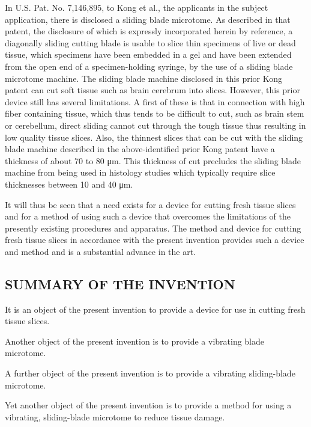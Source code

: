 \documentclass{article}
\begin{document}
In U.S. Pat. No. 7,146,895, to Kong et al., the applicants in the subject application, there is disclosed a sliding blade microtome. As described in that patent, the disclosure of which is expressly incorporated herein by reference, a diagonally sliding cutting blade is usable to slice thin specimens of live or dead tissue, which specimens have been embedded in a gel and have been extended from the open end of a specimen-holding syringe, by the use of a sliding blade microtome machine. The sliding blade machine disclosed in this prior Kong patent can cut soft tissue such as brain cerebrum into slices. However, this prior device still has several limitations. A first of these is that in connection with high fiber containing tissue, which thus tends to be difficult to cut, such as brain stem or cerebellum, direct sliding cannot cut through the tough tissue thus resulting in low quality tissue slices. Also, the thinnest slices that can be cut with the sliding blade machine described in the above-identified prior Kong patent have a thickness of about 70 to 80 μm. This thickness of cut precludes the sliding blade machine from being used in histology studies which typically require slice thicknesses between 10 and 40 μm.

It will thus be seen that a need exists for a device for cutting fresh tissue slices and for a method of using such a device that overcomes the limitations of the presently existing procedures and apparatus. The method and device for cutting fresh tissue slices in accordance with the present invention provides such a device and method and is a substantial advance in the art.

\subsection*{SUMMARY OF THE INVENTION}

It is an object of the present invention to provide a device for use in cutting fresh tissue slices.

Another object of the present invention is to provide a vibrating blade microtome.

A further object of the present invention is to provide a vibrating sliding-blade microtome.

Yet another object of the present invention is to provide a method for using a vibrating, sliding-blade microtome to reduce tissue damage.
\end{document}
